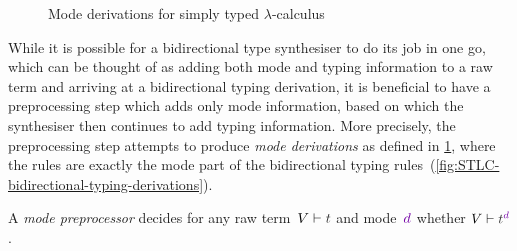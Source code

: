 
\begin{figure}
  \centering
  \small
  \caption{Mode derivations for simply typed $\lambda$-calculus}
  \label{fig:STLC-mode-derivations}
\end{figure}

While it is possible for a bidirectional type synthesiser to do its job in one go, which can be thought of as adding both mode and typing information to a raw term and arriving at a bidirectional typing derivation, it is beneficial to have a preprocessing step which adds only mode information, based on which the synthesiser then continues to add typing information.
More precisely, the preprocessing step attempts to produce \emph{mode derivations} as defined in \cref{fig:STLC-mode-derivations}, where the rules are exactly the mode part of the bidirectional typing rules~(\cref{fig:STLC-bidirectional-typing-derivations}).

\begin{definition}
\label{def:STLC-mode-preprocessor}
A \emph{mode preprocessor} decides for any raw term~$V \vdash \isTerm{t}$ and mode~$\dir{d}$ whether $V \vdash \isTerm{t}^\dir{d}$.
\end{definition}

